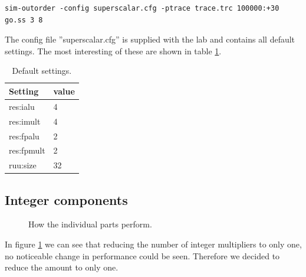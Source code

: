 \documentclass[titlepage, a4paper]{article}
\begin{document}
\begin{lstlisting}[caption=Simulator command., label=sim:simcom, breaklines=true]
sim-outorder -config superscalar.cfg -ptrace trace.trc 100000:+30 go.ss 3 8
\end{lstlisting}

The config file ''superscalar.cfg'' is supplied with the lab and contains all default settings. The most interesting of these are shown in table \ref{tab:default}.

\begin{table}[H]
\centering
\caption{Default settings.}

\begin{tabular}{|l|l|}
  \hline
  \textbf{Setting} & \textbf{value} \\ \hline
  res:ialu & 4 \\ \hline
  res:imult & 4 \\ \hline
  res:fpalu & 2 \\ \hline
  res:fpmult & 2 \\ \hline
  ruu:size & 32 \\ \hline
\end{tabular}

\label{tab:default}
\end{table}


\subsection{Integer components}
\begin{figure}[H]
  \centering
  \caption{How the individual parts perform.}
  \label{fig:performance}
\end{figure}

In figure \ref{fig:performance} we can see that reducing the number of integer multipliers to only one, no noticeable change in performance could be seen. Therefore we decided to reduce the amount to only one.
\end{document}
